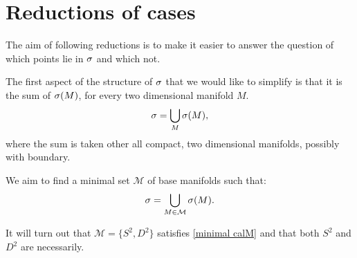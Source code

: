 


\section{Reductions of cases}
The aim of following reductions is to make it easier to answer the question of which 
points lie in ${\sigma}$ and which not. 

The first aspect of the structure of ${\sigma}$ that we would like to simplify is that it is 
the sum of ${{\sigma}(M)}$, for 
every two dimensional manifold $M$. 
\begin{equation}
{\sigma} = \bigcup_{M} {{\sigma}(M)},
\end{equation}
where the sum is taken other all compact, two dimensional manifolds, 
possibly with boundary.


We aim to find a minimal set $\mathcal{M}$ of base manifolds 
such that:
\begin{equation}\label{minimal calM}
{\sigma} = \bigcup_{M\in\mathcal{M}}{{\sigma}(M)}.
\end{equation}

It will turn out that $\mathcal{M} = \{S^2, D^2\}$ satisfies \ref{minimal calM} and 
that both $S^2$ and $D^2$ are necessarily. 


